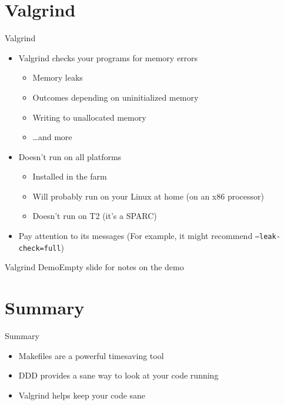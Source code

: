 \documentclass{beamer}
\begin{document}
\section{Valgrind}

\begin{frame}{Valgrind}
  \begin{itemize}
    \item Valgrind checks your programs for memory errors
      \begin{itemize}
        \item Memory leaks
        \item Outcomes depending on uninitialized memory
        \item Writing to unallocated memory
        \item \ldots{}and more
      \end{itemize}
    \item Doesn't run on all platforms
      \begin{itemize}
        \item Installed in the farm
        \item Will probably run on your Linux at home (on an x86 processor)
        \item Doesn't run on T2 (it's a SPARC)
      \end{itemize}
    \item Pay attention to its messages (For example, it might recommend
      \texttt{--leak-check=full})
  \end{itemize}
\end{frame}

 {
\begin{frame}{Valgrind Demo}{Empty slide for notes on the demo}
\end{frame}
}


\section*{Summary}

\begin{frame}{Summary}

  \begin{itemize}
  \item
    Makefiles are a powerful timesaving tool
  \item
    DDD provides a sane way to look at your code running
  \item
    Valgrind helps keep your code sane
  \end{itemize}
\end{frame}
\end{document}
